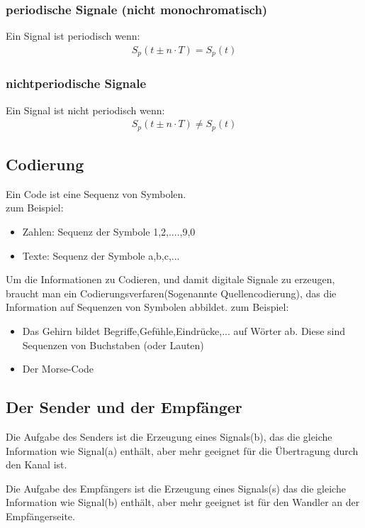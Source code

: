 \documentclass[a4paper,10pt]{article}
\begin{document}
 
\subsubsection{periodische Signale (nicht monochromatisch)}
Ein Signal ist periodisch wenn:
\begin{align}
   S_p(t\pm n\cdot T) = S_p(t)
\end{align}

\subsubsection{nichtperiodische Signale}
Ein Signal ist nicht periodisch wenn:
\begin{align}
   S_p(t\pm n\cdot T) \neq S_p(t)
\end{align}


\subsection{Codierung}
Ein Code ist eine Sequenz von Symbolen.\\
zum Beispiel:\\
\begin{itemize}
 \item Zahlen: Sequenz der Symbole 1,2,....,9,0
 \item Texte: Sequenz der Symbole a,b,c,...
\end{itemize}
Um die Informationen zu Codieren, und damit digitale Signale zu erzeugen, braucht man ein Codierungsverfaren(Sogenannte Quellencodierung),
das die Information auf Sequenzen von Symbolen abbildet.
zum Beispiel:\\
\begin{itemize}
 \item Das Gehirn bildet Begriffe,Gefühle,Eindrücke,... auf Wörter ab. Diese sind Sequenzen von Buchstaben (oder Lauten)
 \item Der Morse-Code
\end{itemize}

\subsection{Der Sender und der Empfänger}
Die Aufgabe des Senders ist die Erzeugung eines Signals(b), das die gleiche Information wie Signal(a)
enthält, aber mehr geeignet für die Übertragung durch den Kanal ist.


Die Aufgabe des Empfängers ist die Erzeugung eines Signals(s) das die gleiche Information wie Signal(b)
enthält, aber mehr geeignet ist für den Wandler an der Empfängerseite.
\end{document}
